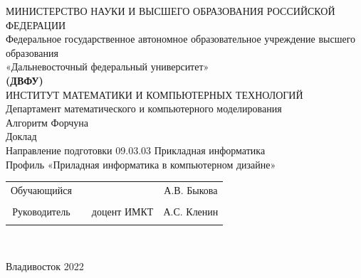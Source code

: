 \documentclass[ a4paper]{article}
\begin{document}
\begin{center}
\hfill \break
\large{МИНИСТЕРСТВО НАУКИ И ВЫСШЕГО ОБРАЗОВАНИЯ РОССИЙСКОЙ ФЕДЕРАЦИИ}\\
\footnotesize{Федеральное государственное автономное образовательное учреждение высшего образования}\\ 
\footnotesize{«Дальневосточный федеральный университет»}\\
\small{\textbf{(ДВФУ)}}\\
\hfill \break
\normalsize{ИНСТИТУТ МАТЕМАТИКИ И КОМПЬЮТЕРНЫХ ТЕХНОЛОГИЙ}\\
 \hfill \break
\normalsize{Департамент математического и компьютерного моделирования}\\
\hfill\break
\hfill \break
\hfill \break
\hfill \break
\large{Алгоритм Форчуна}\\
\hfill \break
\hfill \break
\hfill \break
\normalsize{Доклад\\
\hfill \break
Направление подготовки 09.03.03 Прикладная информатика\\
\hfill \break
Профиль «Приладная информатика в компьютерном дизайне»}\\
\hfill \break
\hfill \break
\end{center}
 
\normalsize{} \hfill \break
\hfill \break
 
\normalsize{ 
\begin{tabular}{cccc}
Обучающийся & \underline{\hspace{3cm}} & &А.В. Быкова \\\\
Руководитель & \underline{\hspace{3cm}}& доцент ИМКТ &А.С. Кленин \\\\
\end{tabular}
}\\
\hfill \break
\hfill \break
\begin{center} Владивосток 2022 \end{center}
\thispagestyle{empty} 
 
\newpage
     
\end{document}

